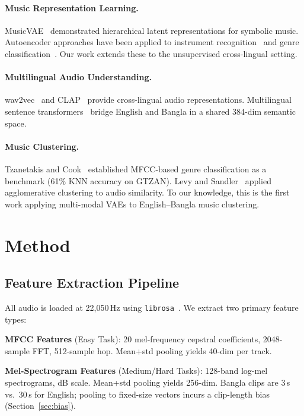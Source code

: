 \documentclass{article}
\begin{document}
\paragraph{Music Representation Learning.}
MusicVAE~\cite{roberts2018hierarchical} demonstrated hierarchical latent representations
for symbolic music. Autoencoder approaches have been applied to instrument
recognition~\cite{choi2016automatic} and genre classification~\cite{dong2018convolutional}.
Our work extends these to the unsupervised cross-lingual setting.

\paragraph{Multilingual Audio Understanding.}
wav2vec~\cite{baevski2020wav2vec} and CLAP~\cite{elizalde2022clap} provide cross-lingual
audio representations. Multilingual sentence transformers~\cite{reimers2019sentence}
bridge English and Bangla in a shared 384-dim semantic space.

\paragraph{Music Clustering.}
Tzanetakis and Cook~\cite{tzanetakis2002musical} established MFCC-based genre
classification as a benchmark (61\% KNN accuracy on GTZAN).
Levy and Sandler~\cite{levy2006music} applied agglomerative clustering to audio
similarity. To our knowledge, this is the first work applying multi-modal VAEs to
English--Bangla music clustering.

\section{Method}

\subsection{Feature Extraction Pipeline}

All audio is loaded at 22,050\,Hz using \texttt{librosa}~\cite{mcfee2015librosa}.
We extract two primary feature types:

\textbf{MFCC Features} (Easy Task): 20 mel-frequency cepstral coefficients, 2048-sample
FFT, 512-sample hop. Mean+std pooling yields 40-dim per track.

\textbf{Mel-Spectrogram Features} (Medium/Hard Tasks): 128-band log-mel spectrograms,
dB scale. Mean+std pooling yields 256-dim. Bangla clips are 3\,s vs.\ 30\,s for
English; pooling to fixed-size vectors incurs a clip-length bias
(Section~\ref{sec:bias}).
\end{document}
